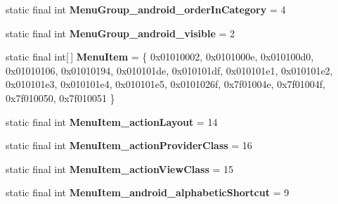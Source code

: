 \begin{DoxyCompactItemize}
\item 
\hypertarget{classandroid_1_1support_1_1design_1_1_r_1_1styleable_a919b5d091d76ee965d77c57ff5b12647}{}static final int {\bfseries Menu\+Group\+\_\+android\+\_\+order\+In\+Category} = 4\label{classandroid_1_1support_1_1design_1_1_r_1_1styleable_a919b5d091d76ee965d77c57ff5b12647}

\item 
\hypertarget{classandroid_1_1support_1_1design_1_1_r_1_1styleable_ab7b47c5aa76f22fc272f685f8f50c208}{}static final int {\bfseries Menu\+Group\+\_\+android\+\_\+visible} = 2\label{classandroid_1_1support_1_1design_1_1_r_1_1styleable_ab7b47c5aa76f22fc272f685f8f50c208}

\item 
\hypertarget{classandroid_1_1support_1_1design_1_1_r_1_1styleable_a4c90afdbb461f2bfba191da26fbc881c}{}static final int\mbox{[}$\,$\mbox{]} {\bfseries Menu\+Item} = \{ 0x01010002, 0x0101000e, 0x010100d0, 0x01010106, 0x01010194, 0x010101de, 0x010101df, 0x010101e1, 0x010101e2, 0x010101e3, 0x010101e4, 0x010101e5, 0x0101026f, 0x7f01004e, 0x7f01004f, 0x7f010050, 0x7f010051 \}\label{classandroid_1_1support_1_1design_1_1_r_1_1styleable_a4c90afdbb461f2bfba191da26fbc881c}

\item 
\hypertarget{classandroid_1_1support_1_1design_1_1_r_1_1styleable_acea82da8f9d7bec29eb669375e904049}{}static final int {\bfseries Menu\+Item\+\_\+action\+Layout} = 14\label{classandroid_1_1support_1_1design_1_1_r_1_1styleable_acea82da8f9d7bec29eb669375e904049}

\item 
\hypertarget{classandroid_1_1support_1_1design_1_1_r_1_1styleable_a5ccb9af96cb8f5856eabfcc584bbe29e}{}static final int {\bfseries Menu\+Item\+\_\+action\+Provider\+Class} = 16\label{classandroid_1_1support_1_1design_1_1_r_1_1styleable_a5ccb9af96cb8f5856eabfcc584bbe29e}

\item 
\hypertarget{classandroid_1_1support_1_1design_1_1_r_1_1styleable_ae854f3663bd672c1729dd9f452823498}{}static final int {\bfseries Menu\+Item\+\_\+action\+View\+Class} = 15\label{classandroid_1_1support_1_1design_1_1_r_1_1styleable_ae854f3663bd672c1729dd9f452823498}

\item 
\hypertarget{classandroid_1_1support_1_1design_1_1_r_1_1styleable_afee7a912a1adb53b44b84875b958dcc2}{}static final int {\bfseries Menu\+Item\+\_\+android\+\_\+alphabetic\+Shortcut} = 9\label{classandroid_1_1support_1_1design_1_1_r_1_1styleable_afee7a912a1adb53b44b84875b958dcc2}


\end{DoxyCompactItemize}
